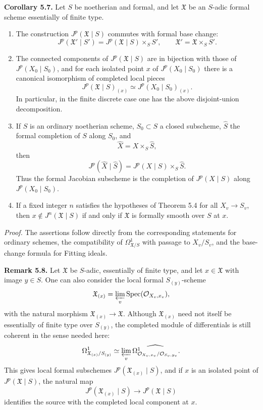\documentclass[11pt]{article}
\providecommand{\Spec}{\operatorname{Spec}}
\begin{document}
\textbf{Corollary 5.7.}  Let \(S\) be noetherian and formal, and let \(\mathfrak X\) be an \(S\)-adic formal scheme essentially of finite type.
\begin{enumerate}[label=(\arabic*)]
\item The construction \(J^p(\mathfrak X\mid S)\) commutes with formal base change:
\[
        J^p(\mathfrak X'\mid S')=
        J^p(\mathfrak X\mid S)\times_S S',
        \qquad \mathfrak X'=\mathfrak X\times_S S'.
\]
\item The connected components of \(J^p(\mathfrak X\mid S)\) are in bijection with those of \(J^p(X_0\mid S_0)\), and for each isolated point \(x\) of \(J^p(X_0\mid S_0)\) there is a canonical isomorphism of completed local pieces
\[
        J^p(\mathfrak X\mid S)_{(x)}
        \simeq
        J^p(X_0\mid S_0)_{(x)} .
\]
In particular, in the finite discrete case one has the above disjoint-union decomposition.
\item If \(S\) is an ordinary noetherian scheme, \(S_0\subset S\) a closed subscheme, \(\widehat S\) the formal completion of \(S\) along \(S_0\), and
\[
        \widehat X=X\times_S\widehat S,
\]
then
\[
        J^p(\widehat X\mid \widehat S)
        =
        J^p(X\mid S)\times_S \widehat S.
\]
Thus the formal Jacobian subscheme is the completion of \(J^p(X\mid S)\) along \(J^p(X_0\mid S_0)\).
\item If a fixed integer \(n\) satisfies the hypotheses of Theorem 5.4 for all \(X_v\to S_v\), then \(x\notin J^n(\mathfrak X\mid S)\) if and only if \(\mathfrak X\) is formally smooth over \(S\) at \(x\).
\end{enumerate}

\emph{Proof.}  The assertions follow directly from the corresponding statements for ordinary schemes, the compatibility of \(\Omega^1_{\mathfrak X/S}\) with passage to \(X_v/S_v\), and the base-change formula for Fitting ideals.

\textbf{Remark 5.8.}  Let \(\mathfrak X\) be \(S\)-adic, essentially of finite type, and let \(x\in\mathfrak X\) with image \(y\in S\).  One can also consider the local formal \(S_{(y)}\)-scheme
\[
        \mathfrak X_{(x)}=\varprojlim_v \Spec(\Oo_{X_v,x_v}),
\]
with the natural morphism \(\mathfrak X_{(x)}\to\mathfrak X\).  Although \(\mathfrak X_{(x)}\) need not itself be essentially of finite type over \(S_{(y)}\), the completed module of differentials is still coherent in the sense needed here:
\[
        \Omega^1_{\mathfrak X_{(x)}/S_{(y)}}
        \simeq
        \varprojlim_v \widehat{\Omega^1_{\mathcal O_{X_v,x_v}/\mathcal O_{S_v,y_v}}}.
\]
This gives local formal subschemes \(J^p(\mathfrak X_{(x)}\mid S)\), and if \(x\) is an isolated point of \(J^p(\mathfrak X\mid S)\), the natural map
\[
        J^p(\mathfrak X_{(x)}\mid S)\longrightarrow J^p(\mathfrak X\mid S)
\]
identifies the source with the completed local component at \(x\).
\end{document}
